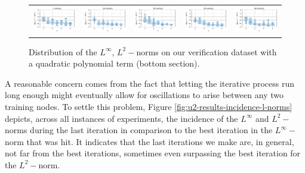 \documentclass[12pt]{report} %
\begin{document}
\begin{figure}
\begin{tabular}{ccccc}
     {\includegraphics[width=.014\textwidth,clip=true,trim={0 0 9cm 0}]{imagenes/experiments/1d/statistical_1d_full_scheduler_interpolation/violins/violins_l2_u2_C7_gaussian_kernel_shape_0.78125_Poly2.pdf}} & \includegraphics[width=.2\textwidth,clip=true,trim={.81cm 0 0 0}]{imagenes/experiments/1d/statistical_1d_full_scheduler_interpolation/violins/violins_l2_u2_C30_gaussian_kernel_shape_5.6152_Poly2.pdf}  & \includegraphics[width=.2\textwidth,clip=true,trim={.81cm 0 0 0}]{imagenes/experiments/1d/statistical_1d_full_scheduler_interpolation/violins/violins_l2_u2_C40_gaussian_kernel_shape_7.8125_Poly2.pdf}  & \includegraphics[width=.2\textwidth,clip=true,trim={.81cm 0 0 0}]{imagenes/experiments/1d/statistical_1d_full_scheduler_interpolation/violins/violins_l2_u2_C50_gaussian_kernel_shape_9.7656_Poly2.pdf} & \includegraphics[width=.2\textwidth,clip=true,trim={.81cm 0 0 0}]{imagenes/experiments/1d/statistical_1d_full_scheduler_interpolation/violins/violins_l2_u2_C60_gaussian_kernel_shape_11.7188_Poly2.pdf}   \\
  \end{tabular}
  \caption{Distribution of the $L^\infty$, $L^2-$norms on our verification dataset
    with a quadratic polynomial term (bottom section).}
  \label{fig:u2-results-overall-poly2}
\end{figure}

A reasonable concern comes from the fact that letting the iterative process run long enough might eventually allow for oscillations to arise between any two training nodes. To settle this problem, Figure \ref{fig:u2-results-incidence-l-norms} depicts, across all instances of experiments, the incidence of the $L^\infty$ and $L^2-$norms during the last iteration in comparison to the best iteration in the $L^\infty-$norm that was hit. It indicates that the last iterations we make are, in general, not far from the best iterations, sometimes even surpassing the best iteration for the $L^2-$norm.
\end{document}
